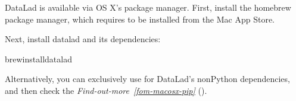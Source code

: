 \sphinxAtStartPar
DataLad is available via OS X’s  package manager.
First, install the homebrew package manager, which requires  to be installed from the
Mac App Store.

\sphinxAtStartPar
Next, install datalad and its dependencies:

\begin{sphinxVerbatim}[commandchars=\\\{\}]
brewinstalldatalad
\end{sphinxVerbatim}

\sphinxAtStartPar
Alternatively, you can exclusively use  for DataLad’s non\sphinxhyphen{}Python
dependencies, and then check the \textit{Find-out-more}~{\findoutmoreiconinline}\textit{\ref{fom-macosx-pip}} {\hyperref[\detokenize{intro/installation:fom-macosx-pip}]{}} ().
